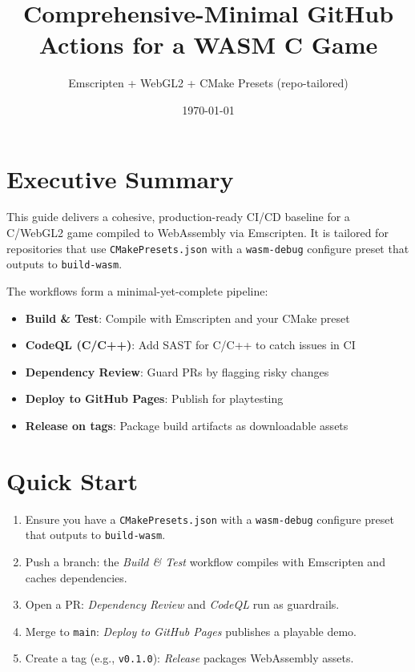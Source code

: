 \documentclass[11pt]{article}
\title{\textbf{Comprehensive-Minimal GitHub Actions for a WASM C Game}}
\author{Emscripten + WebGL2 + CMake Presets (repo-tailored)}
\date{\today}
\begin{document}
\maketitle

\tableofcontents
\clearpage

\section{Executive Summary}

This guide delivers a cohesive, production-ready CI/CD baseline for a C/WebGL2 game compiled to WebAssembly via Emscripten. It is tailored for repositories that use \texttt{CMakePresets.json} with a \texttt{wasm-debug} configure preset that outputs to \texttt{build-wasm}.

The workflows form a minimal-yet-complete pipeline:
\begin{itemize}
  \item \textbf{Build \& Test}: Compile with Emscripten and your CMake preset
  \item \textbf{CodeQL (C/C++)}: Add SAST for C/C++ to catch issues in CI
  \item \textbf{Dependency Review}: Guard PRs by flagging risky changes
  \item \textbf{Deploy to GitHub Pages}: Publish for playtesting
  \item \textbf{Release on tags}: Package build artifacts as downloadable assets
\end{itemize}

\section{Quick Start}

\begin{enumerate}
  \item Ensure you have a \texttt{CMakePresets.json} with a \texttt{wasm-debug} configure preset that outputs to \texttt{build-wasm}.
  \item Push a branch: the \emph{Build \& Test} workflow compiles with Emscripten and caches dependencies.
  \item Open a PR: \emph{Dependency Review} and \emph{CodeQL} run as guardrails.
  \item Merge to \texttt{main}: \emph{Deploy to GitHub Pages} publishes a playable demo.
  \item Create a tag (e.g., \texttt{v0.1.0}): \emph{Release} packages WebAssembly assets.
\end{enumerate}
\end{document}
